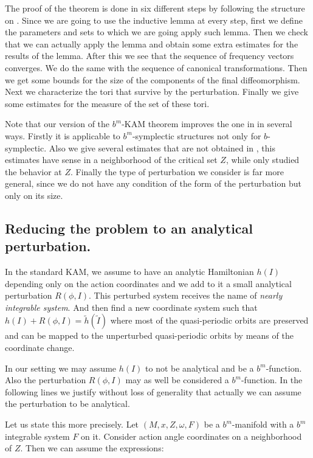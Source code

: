 The proof of the theorem is done in six different steps by following the structure on \cite{D}. Since we are going to use the inductive lemma at every step, first we define the parameters and sets to which  we are going apply such lemma. Then we check that we can actually apply the lemma and obtain some extra estimates for the results of the lemma. After this we see that the sequence of frequency vectors converges. We do the same with the sequence of canonical transformations. Then we get some bounds for the size of the components of the final diffeomorphism. Next we characterize the tori that survive by the perturbation. Finally we give some estimates for the measure of the set of these tori.

Note that our version of the $b^m$-KAM theorem improves the one in \cite{KMS16} in several ways. Firstly it is applicable to $b^m$-symplectic structures not only for $b$-symplectic. Also we give several estimates that are not obtained in \cite{KMS16}, this estimates have sense in a neighborhood of the critical set $Z$, while \cite{KMS16} only studied the behavior at $Z$. Finally the type of perturbation we consider is far more general, since we do not have any condition of the form of the perturbation but only on its size.


\subsection{Reducing the problem to an analytical perturbation.}

In the standard KAM, we assume to have an analytic Hamiltonian $h(I)$ depending only on the action coordinates and we add to it a small analytical perturbation $R(\phi,I)$. This perturbed system receives the name of \emph{nearly integrable system}. And then find a new coordinate system such that $h(I) + R(\phi,I) = \tilde h(\tilde I)$ where most of the quasi-periodic orbits are preserved and can be mapped to the unperturbed quasi-periodic orbits by means of the coordinate change.

In our setting we may assume $h(I)$ to not be analytical and be a $b^m$-function. Also the  perturbation $R(\phi, I)$ may as well be considered a $b^m$-function. In the following lines we justify without loss of generality that actually we can assume the perturbation to be analytical.

Let us state this more precisely. Let $(M,x,Z,\omega,F)$ be a $b^m$-manifold with a $b^m$ integrable system $F$ on it. Consider action angle coordinates on a neighborhood of $Z$.
Then we can assume the expressions:

